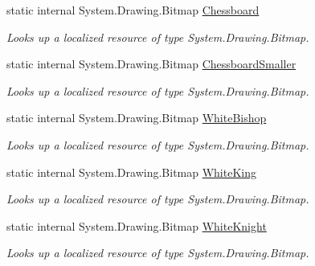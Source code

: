\begin{DoxyCompactItemize}
static internal System.\+Drawing.\+Bitmap \mbox{\hyperlink{class_chess_tracking_1_1_properties_1_1_resources_aa4f23ab25e346501c631880f86f402b5}{Chessboard}}
\begin{DoxyCompactList}\small\item\em Looks up a localized resource of type System.\+Drawing.\+Bitmap. \end{DoxyCompactList}\item 
static internal System.\+Drawing.\+Bitmap \mbox{\hyperlink{class_chess_tracking_1_1_properties_1_1_resources_a141ae20fd93d0547b27ca305c551ce6b}{Chessboard\+Smaller}}
\begin{DoxyCompactList}\small\item\em Looks up a localized resource of type System.\+Drawing.\+Bitmap. \end{DoxyCompactList}\item 
static internal System.\+Drawing.\+Bitmap \mbox{\hyperlink{class_chess_tracking_1_1_properties_1_1_resources_a3187680e690e317f783b11d839d75942}{White\+Bishop}}
\begin{DoxyCompactList}\small\item\em Looks up a localized resource of type System.\+Drawing.\+Bitmap. \end{DoxyCompactList}\item 
static internal System.\+Drawing.\+Bitmap \mbox{\hyperlink{class_chess_tracking_1_1_properties_1_1_resources_ac9809b0106b65e8521e091df1e362bb5}{White\+King}}
\begin{DoxyCompactList}\small\item\em Looks up a localized resource of type System.\+Drawing.\+Bitmap. \end{DoxyCompactList}\item 
static internal System.\+Drawing.\+Bitmap \mbox{\hyperlink{class_chess_tracking_1_1_properties_1_1_resources_adebbb00c8336e7510ae1e18af0693ce7}{White\+Knight}}
\begin{DoxyCompactList}\small\item\em Looks up a localized resource of type System.\+Drawing.\+Bitmap. \end{DoxyCompactList}\item 

\end{DoxyCompactItemize}
